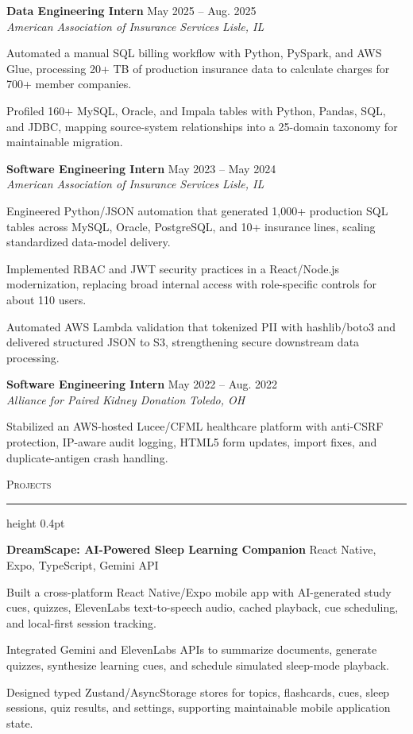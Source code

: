 \documentclass[letterpaper,11pt]{article}
\newcommand{\resumesection}[1]{%
  \par\vspace{2pt}%
  {\large\scshape #1}\par\vspace{2pt}%
  \hrule height 0.4pt\vspace{2pt}%
}
\newcommand{\resumeSubheading}[4]{
  \textbf{#1} \hfill #2\\
  \textit{#3} \hfill \textit{#4}
}
\newcommand{\projectHeading}[2]{
  \textbf{#1} \hfill #2
}
\begin{document}
\resumeSubheading
{Data Engineering Intern}{May 2025 -- Aug. 2025}
{American Association of Insurance Services}{Lisle, IL}
\begin{tightitemize}
  \item Automated a manual SQL billing workflow with Python, PySpark, and AWS Glue, processing 20+ TB of production insurance data to calculate charges for 700+ member companies.
  \item Profiled 160+ MySQL, Oracle, and Impala tables with Python, Pandas, SQL, and JDBC, mapping source-system relationships into a 25-domain taxonomy for maintainable migration.
\end{tightitemize}

\resumeSubheading
{Software Engineering Intern}{May 2023 -- May 2024}
{American Association of Insurance Services}{Lisle, IL}
\begin{tightitemize}
  \item Engineered Python/JSON automation that generated 1,000+ production SQL tables across MySQL, Oracle, PostgreSQL, and 10+ insurance lines, scaling standardized data-model delivery.
  \item Implemented RBAC and JWT security practices in a React/Node.js modernization, replacing broad internal access with role-specific controls for about 110 users.
  \item Automated AWS Lambda validation that tokenized PII with hashlib/boto3 and delivered structured JSON to S3, strengthening secure downstream data processing.
\end{tightitemize}

\resumeSubheading
{Software Engineering Intern}{May 2022 -- Aug. 2022}
{Alliance for Paired Kidney Donation}{Toledo, OH}
\begin{tightitemize}
  \item Stabilized an AWS-hosted Lucee/CFML healthcare platform with anti-CSRF protection, IP-aware audit logging, HTML5 form updates, import fixes, and duplicate-antigen crash handling.
\end{tightitemize}

\resumesection{Projects}
\projectHeading{DreamScape: AI-Powered Sleep Learning Companion}{React Native, Expo, TypeScript, Gemini API}
\begin{tightitemize}
  \item Built a cross-platform React Native/Expo mobile app with AI-generated study cues, quizzes, ElevenLabs text-to-speech audio, cached playback, cue scheduling, and local-first session tracking.
  \item Integrated Gemini and ElevenLabs APIs to summarize documents, generate quizzes, synthesize learning cues, and schedule simulated sleep-mode playback.
  \item Designed typed Zustand/AsyncStorage stores for topics, flashcards, cues, sleep sessions, quiz results, and settings, supporting maintainable mobile application state.
\end{tightitemize}
\end{document}
